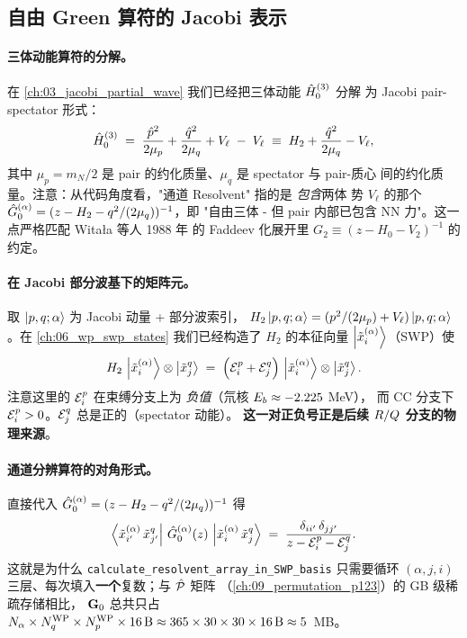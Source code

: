 \subsection{自由 Green 算符的 Jacobi 表示}
\label{subsec:ch10-G0-Jacobi}

\paragraph{三体动能算符的分解。}
在 \cref{ch:03_jacobi_partial_wave} 我们已经把三体动能 \(\hat{H}_0^{(3)}\) 分解
为 Jacobi pair-spectator 形式：
\begin{equation}
\label{eq:ch10-T-decomp}
\hat{H}_0^{(3)} \;=\; \frac{\hat{p}^2}{2\mu_p} + \frac{\hat{q}^2}{2\mu_q} + V_{\ell}
\;-\; V_{\ell}
\;\equiv\; H_2 + \frac{\hat{q}^2}{2\mu_q} - V_{\ell},
\end{equation}
其中 \(\mu_p = m_N/2\) 是 pair 的约化质量、\(\mu_q\) 是 spectator 与 pair-质心
间的约化质量。注意：从代码角度看，"通道 Resolvent" 指的是 \emph{包含}两体
势 \(V_\ell\) 的那个 \(\hat{G}_{0}^{(\alpha)} = (z - H_2 - q^2/(2\mu_q))^{-1}\)，即
"自由三体 - 但 pair 内部已包含 NN 力"。这一点严格匹配 Witała 等人 1988 年
\cite{Witala1988} 的 Faddeev 化展开里 \(G_2 \equiv (z - H_0 - V_2)^{-1}\) 的
约定。

\paragraph{在 Jacobi 部分波基下的矩阵元。}
取 \(\ket{p, q; \alpha}\) 为 Jacobi 动量 + 部分波索引，
\(H_2\ket{p, q; \alpha} = (p^2/(2\mu_p) + V_\ell)\ket{p, q; \alpha}\)。在
\cref{ch:06_wp_swp_states} 我们已经构造了 \(H_2\) 的本征向量
\(\ket{\tilde{x}_i^{(\alpha)}}\)（SWP）使
\begin{equation}
\label{eq:ch10-H2-eigen}
H_2\, \ket{\tilde{x}_i^{(\alpha)}}\otimes\ket{\tilde{x}_j^{q}}
\;=\;
\Bigl({\mathcal{E}_{i}^{p}} + {\mathcal{E}_{j}^{q}}\Bigr)\, \ket{\tilde{x}_i^{(\alpha)}}\otimes\ket{\tilde{x}_j^{q}}.
\end{equation}
注意这里的 \({\mathcal{E}_{i}^{p}}\) 在束缚分支上为 \emph{负值}（氘核 \(E_b \approx -2.225\) MeV），
而 CC 分支下 \({\mathcal{E}_{i}^{p}} > 0\)。\({\mathcal{E}_{j}^{q}}\) 总是正的（spectator 动能）。
\textbf{这一对正负号正是后续 \(R/Q\) 分支的物理来源}。

\paragraph{通道分辨算符的对角形式。}
直接代入 \(\hat{G}_{0}^{(\alpha)} = (z - H_2 - q^2/(2\mu_q))^{-1}\) 得
\begin{equation}
\label{eq:ch10-G-diag-eigen}
\bra{\tilde{x}_{i'}^{(\alpha)}\, \tilde{x}_{j'}^{q}}\, \hat{G}_{0}^{(\alpha)}(z)\,
\ket{\tilde{x}_{i}^{(\alpha)}\, \tilde{x}_{j}^{q}}
\;=\;
\frac{\delta_{ii'}\, \delta_{jj'}}{z - {\mathcal{E}_{i}^{p}} - {\mathcal{E}_{j}^{q}}}.
\end{equation}
这就是为什么 \texttt{calculate\_resolvent\_array\_in\_SWP\_basis} 只需要循环
\((\alpha, j, i)\) 三层、每次填入\textbf{一个}复数；与 \(\hat{\mathcal{P}}\) 矩阵
（\cref{ch:09_permutation_p123}）的 GB 级稀疏存储相比，
\(\mathbf{G}_0\) 总共只占
\(N_\alpha \times {N_{q}^{\text{WP}}} \times {N_{p}^{\text{WP}}} \times 16\,\text{B} \approx
365 \times 30 \times 30 \times 16\,\text{B} \approx 5\)~MB。

